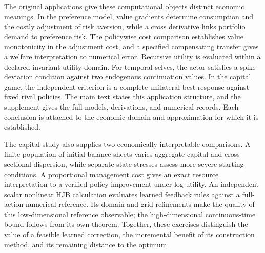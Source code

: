 The original applications give these computational objects distinct economic meanings. In the preference model, value gradients determine consumption and the costly adjustment of risk aversion, while a cross derivative links portfolio demand to preference risk. The policywise cost comparison establishes value monotonicity in the adjustment cost, and a specified compensating transfer gives a welfare interpretation to numerical error. Recursive utility is evaluated within a declared invariant utility domain. For temporal selves, the actor satisfies a spike-deviation condition against two endogenous continuation values. In the capital game, the independent criterion is a complete unilateral best response against fixed rival policies. The main text states this application structure, and the supplement gives the full models, derivations, and numerical records. Each conclusion is attached to the economic domain and approximation for which it is established.

The capital study also supplies two economically interpretable comparisons. A finite population of initial balance sheets varies aggregate capital and cross-sectional dispersion, while separate state stresses assess more severe starting conditions. A proportional management cost gives an exact resource interpretation to a verified policy improvement under log utility. An independent scalar nonlinear HJB calculation evaluates learned feedback rules against a full-action numerical reference. Its domain and grid refinements make the quality of this low-dimensional reference observable; the high-dimensional continuous-time bound follows from its own theorem. Together, these exercises distinguish the value of a feasible learned correction, the incremental benefit of its construction method, and its remaining distance to the optimum.

